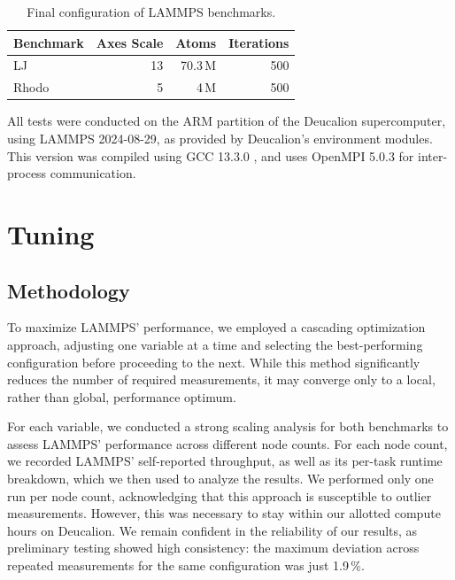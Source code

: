 \documentclass[sigplan, nonacm, screen]{acmart}
\begin{document}
\begin{table}[h]
    \caption{Final configuration of LAMMPS benchmarks.}
    \label{benchmark-configurations}

    \begin{tabular}{lrrr}
        \toprule
        Benchmark & Axes Scale &   Atoms & Iterations \\
        \midrule
        LJ        &         13 & 70.3\,M &        500 \\
        Rhodo     &          5 &    4\,M &        500 \\
        \bottomrule
    \end{tabular}
\end{table}


All tests were conducted on the ARM partition of the Deucalion supercomputer, using LAMMPS
\mbox{2024-08-29}, as provided by Deucalion's environment modules. This version was compiled using
GCC 13.3.0 \cite{gcc}, and uses OpenMPI 5.0.3 \cite{open-mpi} for inter-process communication.

\section{Tuning} %
\label{tuning}

\subsection{Methodology} %
\label{tuning-methodology}

To maximize LAMMPS' performance, we employed a cascading optimization approach, adjusting one
variable at a time and selecting the best-performing configuration before proceeding to the next.
While this method significantly reduces the number of required measurements, it may converge only to
a local, rather than global, performance optimum.

For each variable, we conducted a strong scaling analysis for both benchmarks to assess LAMMPS'
performance across different node counts. For each node count, we recorded LAMMPS' self-reported
throughput, as well as its per-task runtime breakdown, which we then used to analyze the results. We
performed only one run per node count, acknowledging that this approach is susceptible to outlier
measurements. However, this was necessary to stay within our allotted compute hours on Deucalion. We
remain confident in the reliability of our results, as preliminary testing showed high consistency:
the maximum deviation across repeated measurements for the same configuration was just 1.9\,\%.
\end{document}
